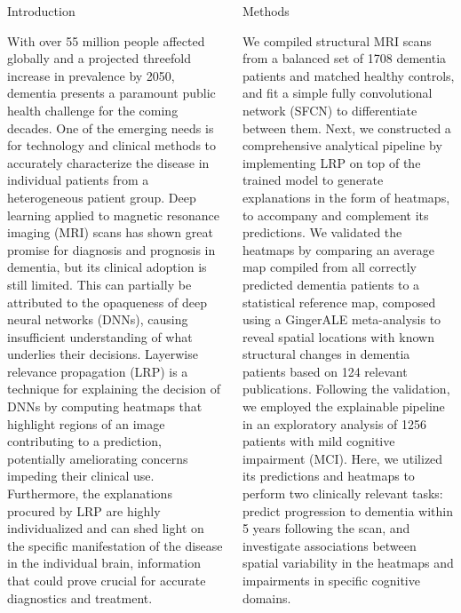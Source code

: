 \documentclass[final,11pt]{beamer}
\begin{document}
\begin{frame}[t]
        \vspace{1cm}
        

        \begin{columns}[t]
            \begin{column}{.3\textwidth}
                \begin{block}{Introduction}
                    \parbox{\linewidth}{\justify
With over 55 million people affected globally and a projected threefold increase in prevalence by 2050, dementia presents a paramount public health challenge for the coming decades. One of the emerging needs is for technology and clinical methods to accurately characterize the disease in individual patients from a heterogeneous patient group. Deep learning applied to magnetic resonance imaging (MRI) scans has shown great promise for diagnosis and prognosis in dementia, but its clinical adoption is still limited. This can partially be attributed to the opaqueness of deep neural networks (DNNs), causing insufficient understanding of what underlies their decisions. Layerwise relevance propagation (LRP) is a technique for explaining the decision of DNNs by computing heatmaps that highlight regions of an image contributing to a prediction, potentially ameliorating concerns impeding their clinical use. Furthermore, the explanations procured by LRP are highly individualized and can shed light on the specific manifestation of the disease in the individual brain, information that could prove crucial for accurate diagnostics and treatment.
                    }
                \end{block}
            \end{column}
            \begin{column}{.3\textwidth}
                \begin{block}{Methods}
                    \parbox{\linewidth}{\justify
We compiled structural MRI scans from a balanced set of 1708 dementia patients and matched healthy controls, and fit a simple fully convolutional network (SFCN) to differentiate between them. Next, we constructed a comprehensive analytical pipeline by implementing LRP on top of the trained model to generate explanations in the form of heatmaps, to accompany and complement its predictions. We validated the heatmaps by comparing an average map compiled from all correctly predicted dementia patients to a statistical reference map, composed using a GingerALE meta-analysis to reveal spatial locations with known structural changes in dementia patients based on 124 relevant publications. Following the validation, we employed the explainable pipeline in an exploratory analysis of 1256 patients with mild cognitive impairment (MCI). Here, we utilized its predictions and heatmaps to perform two clinically relevant tasks: predict progression to dementia within 5 years following the scan, and investigate associations between spatial variability in the heatmaps and impairments in specific cognitive domains.
                    }
                \end{block}


\end{column}
\end{columns}
\end{frame}
\end{document}

